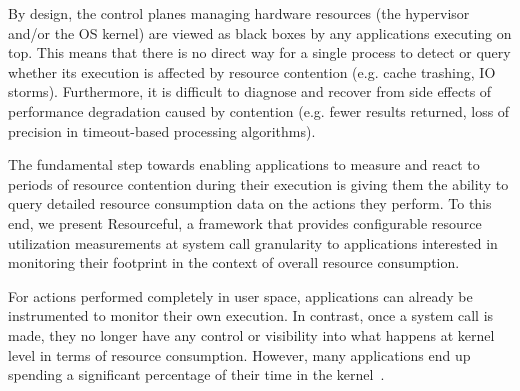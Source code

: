 \documentclass[letterpaper,twocolumn,10pt]{article}
\newcommand{\pname}{Resourceful}
\newcommand{\lnote}[1]{\textcolor{red}{[\textit{#1}]}} %
\begin{document}
By design, the control planes managing hardware resources (the hypervisor and/or
the OS kernel) are viewed as black boxes by any applications executing on top.
This means that there is no direct way for a single process to detect or query
whether its execution is affected by resource contention (e.g. cache trashing, IO
storms). Furthermore, it is difficult to diagnose and recover from side effects
of performance degradation caused by contention (e.g. fewer results returned, loss of
precision in timeout-based processing algorithms).



The fundamental step towards enabling applications to measure and react to periods of
resource contention during their execution is giving them the ability to query
detailed resource consumption data on the actions they perform. To this end, we
present \pname, a framework that provides configurable resource utilization
measurements at system call granularity to applications interested in monitoring
their footprint in the context of overall resource consumption.

For actions performed completely in user space, applications can already be
instrumented to monitor their own execution. In contrast, once a system call is
made, they no longer have any control or visibility into what happens at kernel
level in terms of resource consumption. However, many applications end up
spending a significant percentage of their time in the
kernel~\cite{boyd2010analysis}.
\end{document}
